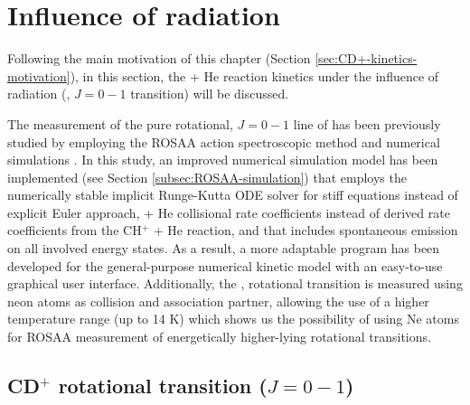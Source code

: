 \section{Influence of radiation}
\label{subsec:rate-constants-laserOn}

Following the main motivation of this chapter (Section
\ref{sec:CD+-kinetics-motivation}), in this section, the \CD + He reaction
kinetics under the influence of radiation (\CD, $J=0-1$ transition) will be
discussed.

The measurement of the pure rotational, $J=0-1$ line of \CD has been previously
studied by employing the ROSAA action spectroscopic method and numerical
simulations \cite{kluge_state-selective_2016, Brunken2017}. In this study, an
improved numerical simulation model has been implemented (see Section
\ref{subsec:ROSAA-simulation}) that employs the numerically stable implicit
Runge-Kutta ODE solver for stiff equations instead of explicit Euler approach,
\CD + He collisional rate coefficients \cite{Werfelli2017} instead of derived
rate coefficients from the CH$^+$ + He reaction, and that includes spontaneous
emission on all involved energy states. As a result, a more adaptable program
has been developed for the general-purpose numerical kinetic model with an
easy-to-use graphical user interface. Additionally, the \CD, \CDline rotational
transition is measured using neon atoms as collision and association partner,
allowing the use of a higher temperature range (up to 14 K) which shows us the
possibility of using Ne atoms for ROSAA measurement of energetically
higher-lying rotational transitions.

\subsection{CD\texorpdfstring{$^+$}{+} rotational transition (\texorpdfstring{$J=0-1$}{J=0-1})}
\label{subsec:CD+-spectroscopy}



